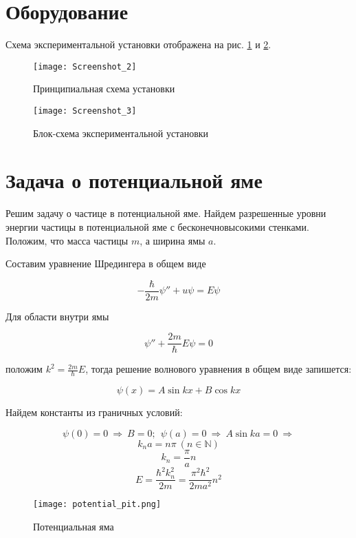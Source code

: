     \section*{Оборудование}

    Схема экспериментальной установки отображена на рис. \ref{fig:screenshot2} и \ref{fig:screenshot3}.

    \begin{figure}[tbh]
        \centering
        \texttt{[image: Screenshot\_2]}
        \caption{Принципиальная схема установки}
        \label{fig:screenshot2}
    \end{figure}

    \begin{figure}[tbh]
        \centering
        \texttt{[image: Screenshot\_3]}
        \caption{Блок-схема экспериментальной установки}
        \label{fig:screenshot3}
    \end{figure}

    \section*{Задача о потенциальной яме}

    Решим задачу о частице в потенциальной яме. Найдем разрешенные уровни энергии частицы
    в потенциальной яме с бесконечновысокими стенками. Положим, что масса частицы $m$, а ширина ямы $a$.

    Составим уравнение Шредингера в общем виде

    \[ -\frac{\hbar}{2 m} \psi'' + u \psi = E \psi \]

    Для области внутри ямы

    \[ \psi'' + \frac{2 m}{\hbar} E \psi = 0 \]

    положим $k^2 = \frac{2 m}{\hbar} E$, тогда решение волнового уравнения в общем виде запишется:

    \[ \psi(x) = A \sin kx + B \cos kx \]

    Найдем константы из граничных условий:

    \[ \psi(0) = 0 ~ \Rightarrow ~ B = 0; ~~ \psi(a) = 0 ~ \Rightarrow ~ A \sin ka = 0 ~ \Rightarrow \]
    \[ k_n a = n \pi ~ (n \in \mathbb{N}) \]
    \[ k_n = \frac{\pi}{a} n \]
    \[ E = \frac{\hbar^2 k_n^2}{2 m} = \frac{\pi^2 \hbar^2}{2 m a^2} n^2 \]

    \begin{figure}[tbh]
        \centering
        \texttt{[image: potential\_pit.png]}
        \caption{Потенциальная яма}
        \label{fig:potential_pit}
    \end{figure}


